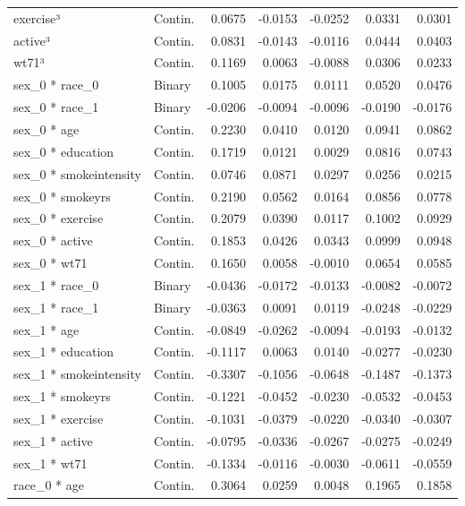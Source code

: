 \begin{table}
\begin{tabular}{llrrrrr}
\addlinespace
exercise³ & Contin. & 0.0675 & -0.0153 & -0.0252 & 0.0331 & 0.0301\\
active³ & Contin. & 0.0831 & -0.0143 & -0.0116 & 0.0444 & 0.0403\\
wt71³ & Contin. & 0.1169 & 0.0063 & -0.0088 & 0.0306 & 0.0233\\
sex\_0 * race\_0 & Binary & 0.1005 & 0.0175 & 0.0111 & 0.0520 & 0.0476\\
sex\_0 * race\_1 & Binary & -0.0206 & -0.0094 & -0.0096 & -0.0190 & -0.0176\\
\addlinespace
sex\_0 * age & Contin. & 0.2230 & 0.0410 & 0.0120 & 0.0941 & 0.0862\\
sex\_0 * education & Contin. & 0.1719 & 0.0121 & 0.0029 & 0.0816 & 0.0743\\
sex\_0 * smokeintensity & Contin. & 0.0746 & 0.0871 & 0.0297 & 0.0256 & 0.0215\\
sex\_0 * smokeyrs & Contin. & 0.2190 & 0.0562 & 0.0164 & 0.0856 & 0.0778\\
sex\_0 * exercise & Contin. & 0.2079 & 0.0390 & 0.0117 & 0.1002 & 0.0929\\
\addlinespace
sex\_0 * active & Contin. & 0.1853 & 0.0426 & 0.0343 & 0.0999 & 0.0948\\
sex\_0 * wt71 & Contin. & 0.1650 & 0.0058 & -0.0010 & 0.0654 & 0.0585\\
sex\_1 * race\_0 & Binary & -0.0436 & -0.0172 & -0.0133 & -0.0082 & -0.0072\\
sex\_1 * race\_1 & Binary & -0.0363 & 0.0091 & 0.0119 & -0.0248 & -0.0229\\
sex\_1 * age & Contin. & -0.0849 & -0.0262 & -0.0094 & -0.0193 & -0.0132\\
\addlinespace
sex\_1 * education & Contin. & -0.1117 & 0.0063 & 0.0140 & -0.0277 & -0.0230\\
sex\_1 * smokeintensity & Contin. & -0.3307 & -0.1056 & -0.0648 & -0.1487 & -0.1373\\
sex\_1 * smokeyrs & Contin. & -0.1221 & -0.0452 & -0.0230 & -0.0532 & -0.0453\\
sex\_1 * exercise & Contin. & -0.1031 & -0.0379 & -0.0220 & -0.0340 & -0.0307\\
sex\_1 * active & Contin. & -0.0795 & -0.0336 & -0.0267 & -0.0275 & -0.0249\\
\addlinespace
sex\_1 * wt71 & Contin. & -0.1334 & -0.0116 & -0.0030 & -0.0611 & -0.0559\\
race\_0 * age & Contin. & 0.3064 & 0.0259 & 0.0048 & 0.1965 & 0.1858\\

\end{tabular}
\end{table}
